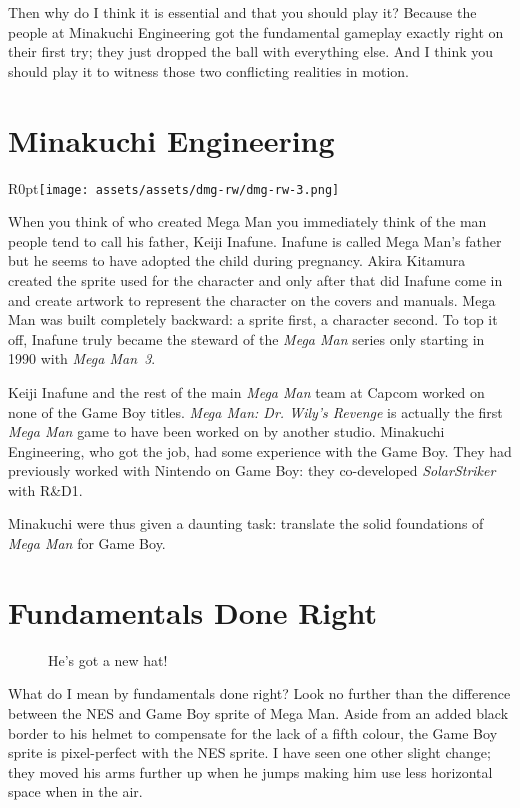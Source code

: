 \documentclass{book}
\begin{document}
Then why do I think it is essential and that you should play it? Because the people at Minakuchi Engineering got the fundamental gameplay exactly right on their first try; they just dropped the ball with everything else. And I think you should play it to witness those two conflicting realities in motion.\par
\FloatBarrier\section*{Minakuchi Engineering}
\begin{wrapfigure}{R}{0pt}{\texttt{[image: assets/assets/dmg-rw/dmg-rw-3.png]}}\end{wrapfigure}
When you think of who created Mega Man you immediately think of the man people tend to call his father, Keiji Inafune. Inafune is called Mega Man’s father but he seems to have adopted the child during pregnancy. Akira Kitamura created the sprite used for the character and only after that did Inafune come in and create artwork to represent the character on the covers and manuals. Mega Man was built completely backward: a sprite first, a character second. To top it off, Inafune truly became the steward of the \emph{Mega Man} series only starting in 1990 with \emph{Mega Man~3}.\par
Keiji Inafune and the rest of the main \emph{Mega Man} team at Capcom worked on none of the Game Boy titles. \emph{Mega Man: Dr. Wily’s Revenge} is actually the first \emph{Mega Man} game to have been worked on by another studio. Minakuchi Engineering, who got the job, had some experience with the Game Boy. They had previously worked with Nintendo on Game Boy: they co-developed \emph{SolarStriker} with R\&D1.\par
Minakuchi were thus given a daunting task: translate the solid foundations of \emph{Mega Man} for Game Boy.\par
\FloatBarrier\section*{Fundamentals Done Right}
\FloatBarrier\vspace{\baselineskip}\begin{figure}[H]\caption*{He’s got a new hat!}\end{figure}
What do I mean by fundamentals done right? Look no further than the difference between the NES and Game Boy sprite of Mega Man. Aside from an added black border to his helmet to compensate for the lack of a fifth colour, the Game Boy sprite is pixel-perfect with the NES sprite. I have seen one other slight change; they moved his arms further up when he jumps making him use less horizontal space when in the air.\par
\end{document}
